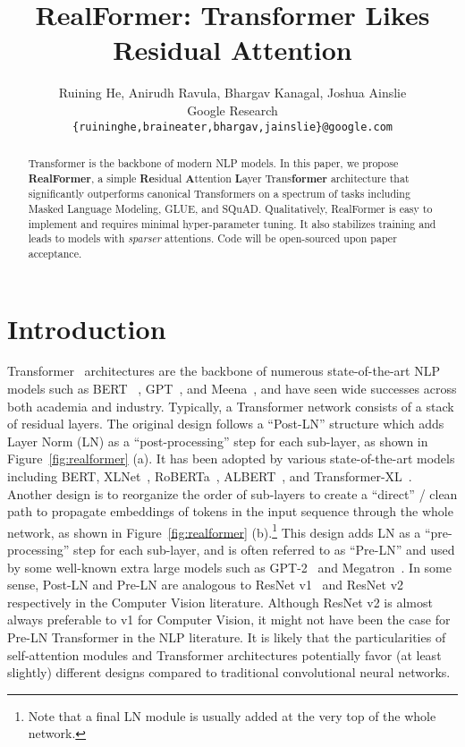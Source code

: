 \documentclass[11pt,a4paper]{article}
\title{RealFormer: Transformer Likes Residual Attention}
\author{Ruining He,  Anirudh Ravula, Bhargav Kanagal, Joshua Ainslie \\
Google Research \\
\texttt{\{ruininghe,braineater,bhargav,jainslie\}@google.com} }
\date{}
\begin{document}
\maketitle

\begin{abstract}
Transformer is the backbone of modern NLP models. In this paper, we propose \textbf{RealFormer}, a simple \textbf{Re}sidual \textbf{A}ttention \textbf{L}ayer Trans\textbf{former} architecture that significantly outperforms canonical Transformers on a spectrum of tasks including Masked Language Modeling, GLUE, and SQuAD. Qualitatively, RealFormer is easy to implement and requires minimal hyper-parameter tuning. It also stabilizes training and leads to models with \emph{sparser} attentions. Code will be open-sourced upon paper acceptance.
\end{abstract}


\section{Introduction}
Transformer~\citep{Vaswani-2017-attention} architectures are the backbone of numerous state-of-the-art NLP models such as BERT ~\citep{Devlin-2019-bert}, GPT~\citep{Radford-2019-gpt2}, and Meena~\citep{Adiwardana-2020-meena}, and have seen wide successes across both academia and industry. Typically, a Transformer network consists of a stack of residual layers. The original design follows a ``Post-LN'' structure which adds Layer Norm (LN) as a ``post-processing'' step for each sub-layer, as shown in Figure~\ref{fig:realformer} (a). It has been adopted by various state-of-the-art models including BERT, XLNet~\citep{Yang-2019-xlnet}, RoBERTa~\citep{Liu-2019-roberta}, ALBERT~\citep{Lan-2019-albert}, and Transformer-XL~\citep{Dai-2019-transformerxl}. Another design is to reorganize the order of sub-layers to create a ``direct'' / clean path to propagate embeddings of tokens in the input sequence through the whole network, as shown in Figure~\ref{fig:realformer} (b).\footnote{Note that a final LN module is usually added at the very top of the whole network.} This design adds LN as a ``pre-processing'' step for each sub-layer, and is often referred to as ``Pre-LN'' and used by some well-known extra large models such as GPT-2~\citep{Radford-2019-gpt2} and Megatron~\citep{Shoeybi-2019-megatron}. In some sense, Post-LN and Pre-LN are analogous to ResNet v1~\citep{He-2016-resnetv1} and ResNet v2~\citep{He-2016-resnetv2} respectively in the Computer Vision literature. Although ResNet v2 is almost always preferable to v1 for Computer Vision, it might not have been the case for Pre-LN Transformer in the NLP literature. It is likely that the particularities of self-attention modules and Transformer architectures potentially favor (at least slightly) different designs compared to traditional convolutional neural networks. 
\end{document}
